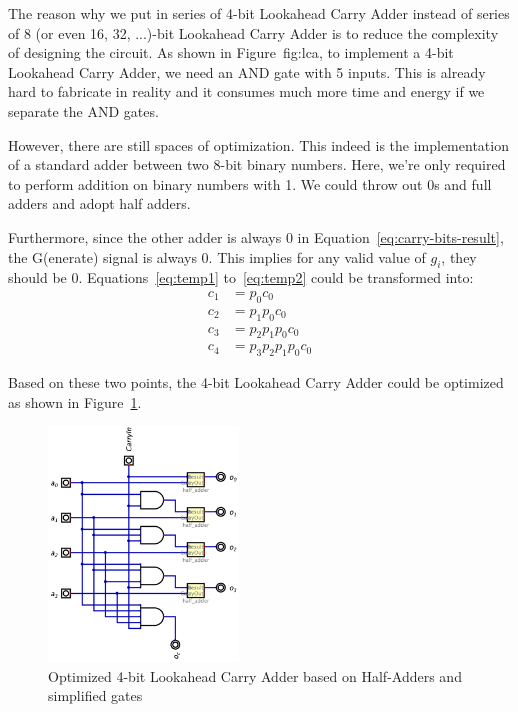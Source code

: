 \documentclass[conference]{IEEEtran}
\begin{document}
The reason why we put in series of 4-bit Lookahead Carry Adder instead of series of 8 (or even 16, 32, ...)-bit Lookahead Carry Adder is to reduce the complexity of designing the circuit.
As shown in Figure~{fig:lca}, to implement a 4-bit Lookahead Carry Adder, we need an AND gate with 5 inputs. This is already hard to fabricate in reality and it consumes much more time and energy if we separate the AND gates.

However, there are still spaces of optimization. This indeed is the implementation of a standard adder between two 8-bit binary numbers. Here, we're only required to perform addition on binary numbers with 1.
We could throw out 0s and full adders and adopt half adders.

Furthermore, since the other adder is always 0 in Equation~\ref{eq:carry-bits-result}, the G(enerate) signal is always 0. This implies for any valid value of $g_i$, they should be 0. Equations~\ref{eq:temp1} to~\ref{eq:temp2} could be transformed into:
\begin{align}
    c_1 &= p_0 c_0 \\
    c_2 &= p_1 p_0 c_0 \\
    c_3 &= p_2 p_1 p_0 c_0 \\
    c_4 &= p_3 p_2 p_1 p_0 c_0
\end{align}

Based on these two points, the 4-bit Lookahead Carry Adder could be optimized as shown in Figure~\ref{fig:lca-optimize}.


\begin{figure}[h!]
    \centering
    \includegraphics[width=0.45\textwidth]{assets/adder_4bits_copy.png}
    \caption{Optimized 4-bit Lookahead Carry Adder based on Half-Adders and simplified gates}
    \label{fig:lca-optimize}
    \end{figure}
\end{document}
